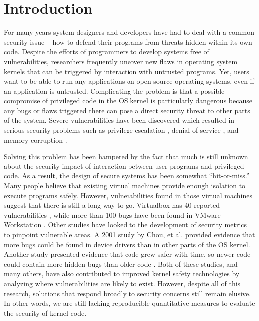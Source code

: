 \section{Introduction}
\label{sec.introduction}

For many years system designers and developers have had to deal with a common security issue -- 
how to defend their programs from threats hidden within its own code. Despite the efforts of programmers 
to develop systems free of vulnerabilities, researchers frequently uncover new flaws in operating system kernels that 
can be triggered by interaction with untrusted programs. Yet, users want to be able to run any applications 
on open source operating systems, even if an application is untrusted. Complicating the problem is that 
a possible compromise of privileged code in the OS kernel is particularly dangerous because any bugs or flaws triggered there 
can pose a direct security threat to other parts of the system. Severe vulnerabilities have been discovered 
which resulted in serious security problems such as privilege escalation \cite{CVE-2016-0728, CVE-2015-8660}, 
denial of service \cite{CVE-2015-8539, CVE-2015-5364}, and memory corruption \cite{CVE-2014-9529}.

Solving this problem has been hampered by the fact that much is still unknown about the security impact of 
interaction between user programs and privileged code. As a result, the design of secure systems has been 
somewhat ``hit-or-miss.'' Many people believe that existing virtual machines provide enough isolation to 
execute programs safely. However, vulnerabilities found in those virtual machines suggest that there is still a long way to go. 
Virtualbox has 40 reported vulnerabilities \cite{Virtualbox-Vulnerabilities}, 
while more than 100 bugs have been found in VMware Workstation \cite{VMWare-Vulnerabilities}. 
Other studies have looked to the development of security metrics to pinpoint vulnerable areas. 
A 2001 study by Chou, et al. \cite{PittSFIeld} provided evidence that more bugs could be found in device drivers than in other parts of the OS kernel. 
Another study presented evidence that code grew safer with time, so newer code could contain more hidden bugs than older code \cite{ozment2006milk}. 
Both of these studies, and many others, have also contributed to improved kernel safety technologies by analyzing where vulnerabilities are likely to exist. 
However, despite all of this research, solutions that respond broadly to security concerns still remain elusive. 
In other words, we are still lacking reproducible quantitative measures to evaluate the security of kernel code. 

